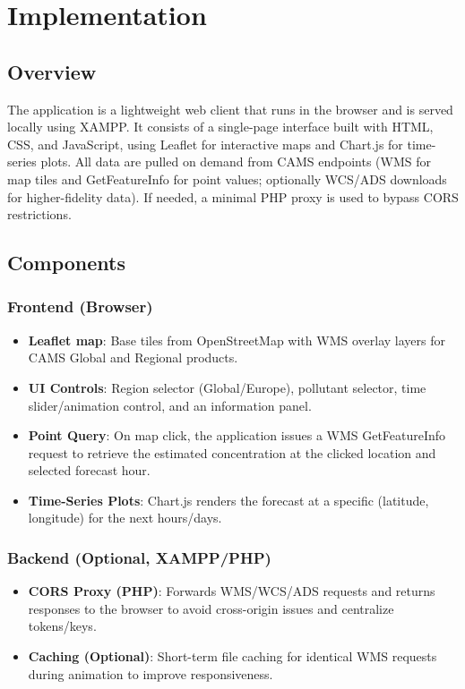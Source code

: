 \chapter[Implementation]{Implementation}
\label{Chap3}

\section{Overview}
The application is a lightweight web client that runs in the browser and is served locally using XAMPP. It consists of a single-page interface built with HTML, CSS, and JavaScript, using Leaflet for interactive maps and Chart.js for time-series plots. All data are pulled on demand from CAMS endpoints (WMS for map tiles and GetFeatureInfo for point values; optionally WCS/ADS downloads for higher-fidelity data). If needed, a minimal PHP proxy is used to bypass CORS restrictions.

\section{Components}
\subsection{Frontend (Browser)}
\begin{itemize}
	\item \textbf{Leaflet map}: Base tiles from OpenStreetMap with WMS overlay layers for CAMS Global and Regional products.
	\item \textbf{UI Controls}: Region selector (Global/Europe), pollutant selector, time slider/animation control, and an information panel.
	\item \textbf{Point Query}: On map click, the application issues a WMS GetFeatureInfo request to retrieve the estimated concentration at the clicked location and selected forecast hour.
	\item \textbf{Time-Series Plots}: Chart.js renders the forecast at a specific (latitude, longitude) for the next hours/days.
\end{itemize}

\subsection{Backend (Optional, XAMPP/PHP)}
\begin{itemize}
	\item \textbf{CORS Proxy (PHP)}: Forwards WMS/WCS/ADS requests and returns responses to the browser to avoid cross-origin issues and centralize tokens/keys.
	\item \textbf{Caching (Optional)}: Short-term file caching for identical WMS requests during animation to improve responsiveness.
\end{itemize}

